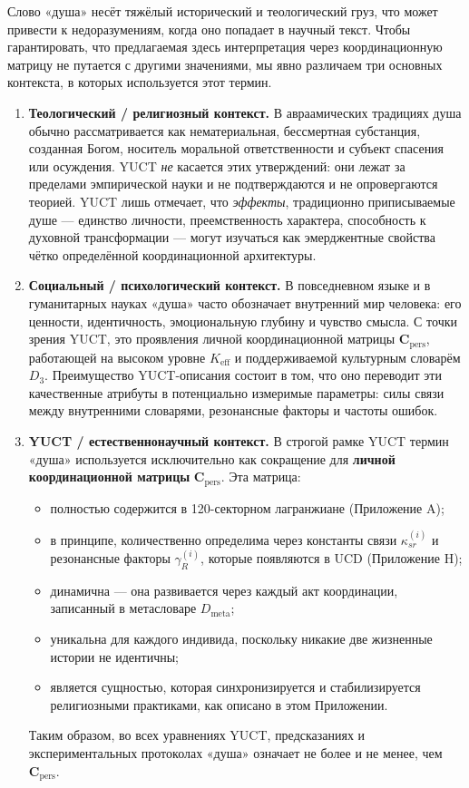 \documentclass[12pt,a4paper]{article}
\begin{document}
	Слово «душа» несёт тяжёлый исторический и теологический груз, что может привести к недоразумениям, когда оно попадает в научный текст. Чтобы гарантировать, что предлагаемая здесь интерпретация через координационную матрицу не путается с другими значениями, мы явно различаем три основных контекста, в которых используется этот термин.
	
	\begin{enumerate}[leftmargin=*]
		\item \textbf{Теологический / религиозный контекст.}
		В авраамических традициях душа обычно рассматривается как нематериальная, бессмертная субстанция, созданная Богом, носитель моральной ответственности и субъект спасения или осуждения. YUCT \emph{не} касается этих утверждений: они лежат за пределами эмпирической науки и не подтверждаются и не опровергаются теорией. YUCT лишь отмечает, что \emph{эффекты}, традиционно приписываемые душе — единство личности, преемственность характера, способность к духовной трансформации — могут изучаться как эмерджентные свойства чётко определённой координационной архитектуры.
		
		\item \textbf{Социальный / психологический контекст.}
		В повседневном языке и в гуманитарных науках «душа» часто обозначает внутренний мир человека: его ценности, идентичность, эмоциональную глубину и чувство смысла. С точки зрения YUCT, это проявления личной координационной матрицы \(\mathbf{C}_{\text{pers}}\), работающей на высоком уровне \(K_{\mathrm{eff}}\) и поддерживаемой культурным словарём \(D_3\). Преимущество YUCT-описания состоит в том, что оно переводит эти качественные атрибуты в потенциально измеримые параметры: силы связи между внутренними словарями, резонансные факторы и частоты ошибок.
		
		\item \textbf{YUCT / естественнонаучный контекст.}
		В строгой рамке YUCT термин «душа» используется исключительно как сокращение для \textbf{личной координационной матрицы} \(\mathbf{C}_{\text{pers}}\). Эта матрица:
		\begin{itemize}
			\item полностью содержится в 120-секторном лагранжиане (Приложение A);
			\item в принципе, количественно определима через константы связи \(\kappa_{sr}^{(i)}\) и резонансные факторы \(\gamma_R^{(i)}\), которые появляются в UCD (Приложение H);
			\item динамична — она развивается через каждый акт координации, записанный в метасловаре \(D_{\text{meta}}\);
			\item уникальна для каждого индивида, поскольку никакие две жизненные истории не идентичны;
			\item является сущностью, которая синхронизируется и стабилизируется религиозными практиками, как описано в этом Приложении.
		\end{itemize}
		Таким образом, во всех уравнениях YUCT, предсказаниях и экспериментальных протоколах «душа» означает не более и не менее, чем \(\mathbf{C}_{\text{pers}}\).
	\end{enumerate}
	
\end{document}
